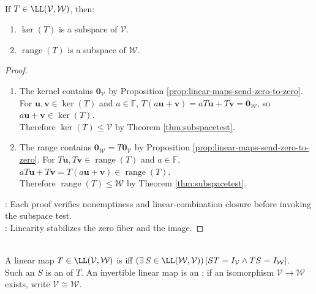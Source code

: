 \begin{proposition} \label{prop:kernel-and-range-are-subspaces} \\
If $T\in\LL(\mathcal{V},\mathcal{W})$, then:
\begin{enumerate}[label=(\roman*)]
\setlength{\itemsep}{0pt}
\item $\ker(T)$ is a subspace of $\mathcal{V}$.
\item $\operatorname{range}(T)$ is a subspace of $\mathcal{W}$.
\end{enumerate}
\begin{proof}
\begin{enumerate}[label=(\roman*)]
\setlength{\itemsep}{0pt}
\item The kernel contains $\mathbf{0}_{\mathcal{V}}$ by Proposition \ref{prop:linear-maps-send-zero-to-zero}. For $\mathbf{u},\mathbf{v}\in\ker(T)$ and $a\in\mathbb{F}$, $T(a\mathbf{u}+\mathbf{v})=aT\mathbf{u}+T\mathbf{v}=\mathbf{0}_{\mathcal{W}}$, so $a\mathbf{u}+\mathbf{v}\in\ker(T)$.\\
Therefore $\ker(T)\leq\mathcal{V}$ by Theorem \ref{thm:subspacetest}.
\item The range contains $\mathbf{0}_{\mathcal{W}}=T\mathbf{0}_{\mathcal{V}}$ by Proposition \ref{prop:linear-maps-send-zero-to-zero}. For $T\mathbf{u},T\mathbf{v}\in\operatorname{range}(T)$ and $a\in\mathbb{F}$, $aT\mathbf{u}+T\mathbf{v}=T(a\mathbf{u}+\mathbf{v})\in\operatorname{range}(T)$.\\
Therefore $\operatorname{range}(T)\leq\mathcal{W}$ by Theorem \ref{thm:subspacetest}.
\end{enumerate}
: Each proof verifies nonemptiness and linear-combination closure before invoking the subspace test.\\
: Linearity stabilizes the zero fiber and the image.
\end{proof}
\end{proposition}

\begin{definition} \label{def:invertible-linear-map-and-isomorphism} \\
A linear map $T\in\LL(\mathcal{V},\mathcal{W})$ is  iff $(\exists\,S\in\LL(\mathcal{W},\mathcal{V}))\,[ST=I_{\mathcal{V}}\land TS=I_{\mathcal{W}}]$.\\
Such an $S$ is an  of $T$. An invertible linear map is an ; if an isomorphism $\mathcal{V}\to\mathcal{W}$ exists, write $\mathcal{V}\cong\mathcal{W}$.
\end{definition}

